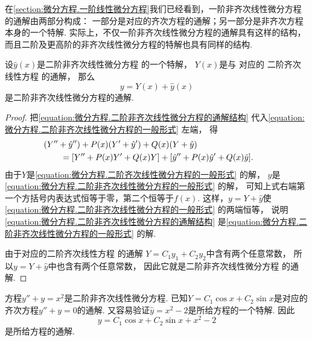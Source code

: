 在\cref{section:微分方程.一阶线性微分方程}我们已经看到，一阶非齐次线性微分方程的通解由两部分构成：
一部分是对应的齐次方程的通解；另一部分是非齐次方程本身的一个特解.
实际上，不仅一阶非齐次线性微分方程的通解具有这样的结构，
而且二阶及更高阶的非齐次线性微分方程的特解也具有同样的结构.
\begin{theorem}\label{theorem:微分方程.二阶非齐次线性微分方程的通解结构}
设\(\hat{y}(x)\)是二阶非齐次线性微分方程  的一个特解，
\(Y(x)\)是与  对应的
二阶齐次线性方程  的通解，
那么\begin{equation}\label{equation:微分方程.二阶非齐次线性微分方程的通解结构}
	y=Y(x)+\hat{y}(x)
\end{equation}是二阶非齐次线性微分方程的通解.
\begin{proof}
把\cref{equation:微分方程.二阶非齐次线性微分方程的通解结构}
代入\cref{equation:微分方程.二阶非齐次线性微分方程的一般形式} 左端，
得\begin{align*}
	&\hspace{-20pt}
	(Y'' + \hat{y}'')
	+ P(x) (Y' + \hat{y}')
	+ Q(x) (Y + \hat{y}) \\
	&= [Y'' + P(x) Y' + Q(x) Y]
	+ [\hat{y}'' + P(x) \hat{y}' + Q(x) \hat{y}].
\end{align*}
由于\(Y\)是\cref{equation:微分方程.二阶齐次线性微分方程的一般形式} 的解，
\(\hat{y}\)是\cref{equation:微分方程.二阶非齐次线性微分方程的一般形式} 的解，
可知上式右端第一个方括号内表达式恒等于零，第二个恒等于\(f(x)\).
这样，\(y = Y + \hat{y}\)使
\cref{equation:微分方程.二阶非齐次线性微分方程的一般形式} 的两端恒等，
说明\cref{equation:微分方程.二阶非齐次线性微分方程的通解结构}
是\cref{equation:微分方程.二阶非齐次线性微分方程的一般形式} 的解.

由于对应的二阶齐次线性方程  的通解
\(Y = C_1 y_1 + C_2 y_2\)中含有两个任意常数，
所以\(y = Y + \hat{y}\)中也含有两个任意常数，
因此它就是二阶非齐次线性微分方程  的通解.
\end{proof}
\end{theorem}

\begin{example}
方程\(y'' + y = x^2\)是二阶非齐次线性微分方程.
已知\(Y = C_1 \cos x + C_2 \sin x\)是对应的齐次方程\(y'' + y = 0\)的通解.
又容易验证\(\hat{y} = x^2 - 2\)是所给方程的一个特解.
因此\[
	y = C_1 \cos x + C_2 \sin x + x^2 - 2
\]是所给方程的通解.
\end{example}

